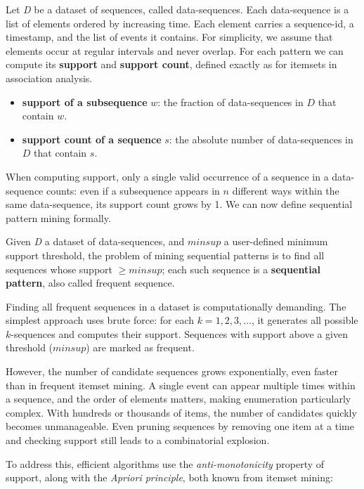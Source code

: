 Let \textit{D} be a dataset of sequences, called data-sequences. Each data-sequence is a list of elements ordered by increasing time. Each element carries a sequence-id, a timestamp, and the list of events it contains. For simplicity, we assume that elements occur at regular intervals and never overlap. For each pattern we can compute its \textbf{support} and \textbf{support count}, defined exactly as for itemsets in association analysis.

\begin{itemize}
    \item \textbf{support of a subsequence} $w$: the fraction of data-sequences in $D$ that contain $w$.
    \item \textbf{support count of a sequence} $s$: the absolute number of data-sequences in $D$ that contain $s$.
\end{itemize}    

When computing support, only a single valid occurrence of a sequence in a data-sequence counts: even if a subsequence appears in $n$ different ways within the same data-sequence, its support count grows by 1. We can now define sequential pattern mining formally.
\begin{definition}
    Given \textit{D} a dataset of data-sequences, and $minsup$ a user-defined minimum support threshold, the problem of mining sequential patterns
    is to find all sequences whose support $\geq minsup$; each such sequence is a \textbf{sequential pattern}, also called frequent sequence. 
\end{definition}

Finding all frequent sequences in a dataset is computationally demanding. The simplest approach uses brute force: for each $k = 1, 2, 3, \ldots$, it generates all possible $k$-sequences and computes their support. Sequences with support above a given threshold ($minsup$) are marked as frequent. 

However, the number of candidate sequences grows exponentially, even faster than in frequent itemset mining. A single event can appear multiple times within a sequence, and the order of elements matters, making enumeration particularly complex. With hundreds or thousands of items, the number of candidates quickly becomes unmanageable. Even pruning sequences by removing one item at a time and checking support still leads to a combinatorial explosion.

To address this, efficient algorithms use the \textit{anti-monotonicity} property of support, along with the \textit{Apriori principle}, both known from itemset mining:

